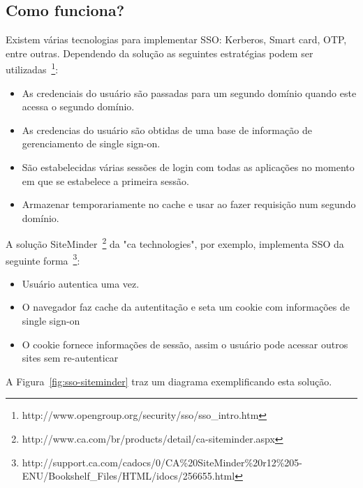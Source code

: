 \documentclass[11pt]{article}
\begin{document}

\subsection{Como funciona?}

Existem várias tecnologias para implementar SSO: Kerberos, Smart card, OTP,
entre outras. Dependendo da solução as seguintes estratégias podem ser
utilizadas~\footnote{http://www.opengroup.org/security/sso/sso\_intro.htm}:

\begin{itemize}
  \item{As credenciais do usuário são passadas para um segundo domínio
        quando este acessa o segundo domínio.}
  \item{As credencias do usuário são obtidas de uma base de informação de
        gerenciamento de single sign-on.}
  \item{São estabelecidas várias sessões de login com todas as aplicações no
        momento em que se estabelece a primeira sessão.}
  \item{Armazenar temporariamente no cache e usar ao fazer requisição num
        segundo domínio.}
\end{itemize}

A solução
SiteMinder~\footnote{http://www.ca.com/br/products/detail/ca-siteminder.aspx}
da "ca technologies", por exemplo, implementa SSO da seguinte
forma~\footnote{http://support.ca.com/cadocs/0/CA\%20SiteMinder\%20r12\%205-ENU/Bookshelf\_Files/HTML/idocs/256655.html}:

\begin{itemize}
  \item{Usuário autentica uma vez.}
  \item{O navegador faz cache da autentitação e seta um cookie com
        informações de single sign-on}
  \item{O cookie fornece informações de sessão, assim o usuário pode acessar
        outros sites sem re-autenticar}
\end{itemize}

A Figura~\ref{fig:sso-siteminder} traz um diagrama exemplificando esta
solução.
\end{document}
